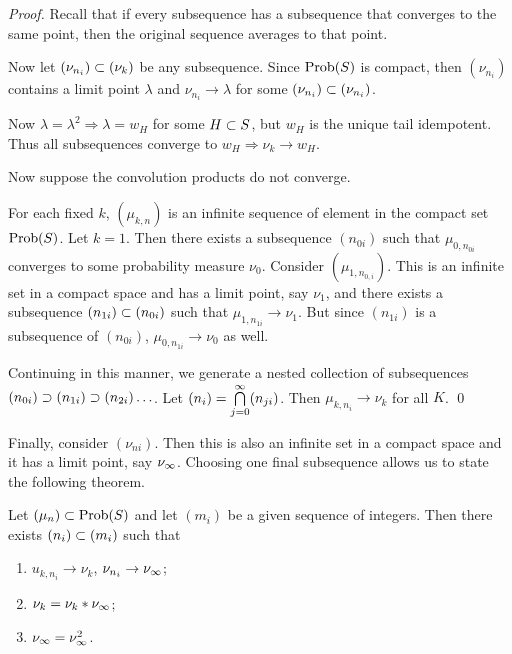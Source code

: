 \begin{proof}  Recall that if every subsequence has a subsequence
that converges to the same point, then the original sequence averages
to that point.

Now let $(\nu_{n_i}) \subset (\nu_k)$ be any subsequence.  
Since $\hbox{Prob}(S)$ is compact, then $(\nu_{n_i})$ contains a limit point $\lambda$ and $\nu_{n_i} \to \lambda$ for some $(\nu_{n_i}) \subset (\nu_{n_i})$.

Now $\lambda = \lambda^2 \Rightarrow \lambda = w_H$ for some $H \subset S$, but $w_H$ is the unique tail idempotent.  
Thus all subsequences converge to $w_H \Rightarrow \nu_k \to w_H$.

Now suppose the convolution products do not converge.

For each fixed $k$, $(\mu_{k,n})$ is an infinite sequence of element in the compact set $\hbox{Prob}(S)$.  Let $k = 1$.  
Then there exists a subsequence $(n_{0i})$ such that $\mu_{0,n_{0i}}$ converges to some probability measure $\nu_0$.  Consider $(\mu_{1,n_{0,i}}).$
This is an infinite set in a compact space and has a limit point, say
$\nu_1$, and there exists a subsequence $(n_{1i}) \subset (n_{0i})$ such
that $\mu_{1,n_{1i}} \to \nu_1$.  
But since $(n_{1i})$ is a subsequence of $(n_{0i})$, $\mu_{0,n_{1i}} \to \nu_0$ as well.

Continuing in this manner, we generate a nested collection of subsequences $(n_{0i}) \supset (n_{1i}) \supset (n_{2i}) \ldots$.  
Let $(n_i) = \bigcap\limits^\infty_{j=0} (n_{ji})$.  
Then $\mu_{k,n_i} \to \nu_k$ for all $K$.
\qed
\end{proof}

Finally, consider $(\nu_{ni})$.  
Then this is also an infinite set in a compact space and it has a limit point, say $\nu_\infty$.
Choosing one final subsequence allows us to state the following
theorem.

\begin{theorem} 	\label{thm:3.5}
Let $(\mu_n) \subset \hbox{Prob}(S)$ and let $(m_i)$ be a given sequence of integers.  
Then there exists $(n_i) \subset (m_i)$ such that
%
\begin{enumerate}
\item[{\normalfont(1)}] $u_{k,n_i} \to \nu_k$, \quad $\nu_{n_i} \to \nu_\infty$;

\item[{\normalfont(2)}] $\nu_k = \nu_k * \nu_\infty$;

\item[{\normalfont(3)}] $\nu_\infty = \nu^2_\infty$.
\end{enumerate}
%
\end{theorem}

